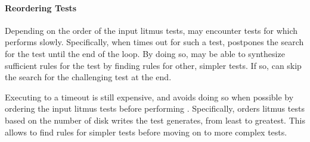 \paragraph{Reordering Tests}
Depending on the order of the input litmus tests, \depsynth may encounter tests for which
 performs slowly. Specifically, when  times out
for such a test, \depsynth postpones the search for the test until the end of the loop.
By doing so, \depsynth may be able to synthesize sufficient rules for the test by
finding rules for other, simpler tests. If so, \depsynth can skip the search for the
challenging test at the end.

Executing  to a timeout is still expensive, and \depsynth avoids doing so
when possible by ordering the input litmus tests before performing \toplevel.
Specifically, \depsynth orders litmus tests based on the number of disk writes the
test generates, from least to greatest. This allows \depsynth to find rules for simpler
tests before moving on to more complex tests.

\fi
